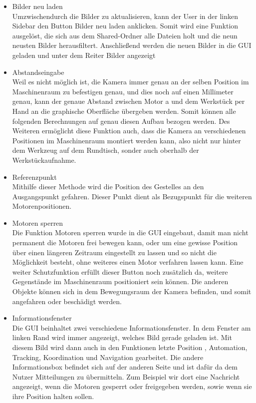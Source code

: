 \documentclass[12pt,a4paper,bibliography=totocnumbered,listof=totocnumbered]{scrartcl}
\begin{document}
\begin{itemize}
\begin{itemize}
\item Bilder neu laden\\
Umzwischendurch die Bilder zu aktualisieren, kann der User in der linken Sidebar den Button \glqq Bilder neu laden\grqq{} anklicken. Somit wird eine Funktion ausgelöst, die sich aus dem \glqq Shared-Ordner\grqq{} alle Dateien holt und die neun neusten Bilder herausfiltert. Anschließend werden die neuen Bilder in die GUI geladen und unter dem Reiter \glqq Bilder \grqq{} angezeigt
\item Abstandseingabe\\ 
Weil es nicht möglich ist, die Kamera immer genau an der selben Position  im Maschinenraum zu befestigen genau, und dies noch auf einen Millimeter genau, kann der genaue Abstand zwischen Motor \glqq a\grqq{} und dem Werkstück per Hand an die graphische Oberfläche übergeben werden. Somit können alle folgenden Berechnungen auf genau diesen Aufbau bezogen werden. Des Weiteren ermöglicht diese Funktion auch, dass die Kamera an verschiedenen Positionen im Maschinenraum montiert werden kann, also nicht nur hinter dem Werkzeug auf dem Rundtisch, sonder auch oberhalb der Werkstückaufnahme.
\item Referenzpunkt\\
Mithilfe dieser Methode wird die Position des Gestelles an den Ausgangspunkt gefahren. Dieser Punkt dient als Bezugspunkt für die weiteren Motorenpositionen.
\item Motoren sperren\\
Die Funktion Motoren sperren wurde in die GUI eingebaut, damit man nicht permanent die Motoren frei bewegen kann, oder um eine gewisse Position über einen längeren Zeitraum eingestellt zu lassen und so nicht die Möglichkeit besteht, ohne weiteres einen Motor verfahren lassen kann. Eine weiter Schutzfunktion erfüllt dieser Button noch zusätzlich da, weitere Gegenstände im Maschinenraum positioniert sein können. Die anderen Objekte können  sich in dem Bewegungsraum der Kamera befinden, und somit angefahren oder beschädigt werden.
\item Informationsfenster\\
Die GUI beinhaltet zwei verschiedene Informationsfenster. In dem Fenster am linken Rand wird immer angezeigt, welches Bild gerade geladen ist. Mit diesem Bild wird dann auch in den Funktionen \glqq letzte Position \grqq{}, \glqq Automation\grqq{}, \glqq Tracking\grqq{}, \glqq Koordination\grqq{} und  \glqq Navigation\grqq{} gearbeitet. Die andere Informationsbox befindet sich auf der anderen Seite und ist dafür da dem Nutzer Mitteilungen zu übermitteln. Zum Beispiel wir dort eine Nachricht angezeigt, wenn die Motoren gesperrt oder freigegeben werden, sowie wenn sie ihre Position halten sollen.

\end{itemize}
\end{itemize}
\end{document}
